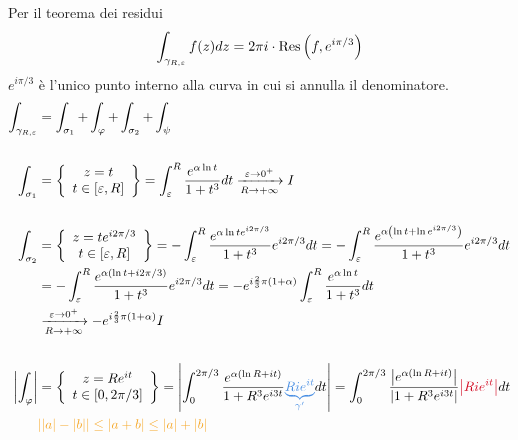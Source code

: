 Per il teorema dei residui
\begin{equation*}
\int_{\gamma_{R, \varepsilon}} f(z) dz = 2\pi i \cdot \operatorname{Res} \left(f, e^{i\pi /3}\right)
\end{equation*}
$e^{i\pi /3}$ è l'unico punto interno alla curva in cui si annulla il denominatore.
\begin{equation*}
\begin{aligned}
\int_{\gamma_{R, \varepsilon}} & = \int_{\sigma_{1}} + \int_{\varphi} + \int_{\sigma_{2}} + \int_{\psi}\\
 & \\
\int_{\sigma_{1}} & = \left\{
\begin{array}{c}
z = t\\
t\in [ \varepsilon, R]
\end{array}\right\} = \int^{R}_{\varepsilon}\frac{e^{\alpha \ln t}}{1 + t^{3}} dt\xrightarrow[R\rightarrow + \infty ]{\varepsilon \rightarrow 0^{+}} I\\
 & \\
\int_{\sigma_{2}} & = \left\{
\begin{array}{c}
z = te^{i2\pi /3}\\
t\in [ \varepsilon, R]
\end{array}\right\} = - \int^{R}_{\varepsilon}\frac{e^{\alpha \ln te^{i2\pi /3}}}{1 + t^{3}} e^{i2\pi /3} dt = -\int^{R}_{\varepsilon}\frac{e^{\alpha \left(\ln t + \ln e^{i2\pi /3}\right)}}{1 + t^{3}} e^{i2\pi /3} dt\\
 & = - \int^{R}_{\varepsilon}\frac{e^{\alpha (\ln t + i2\pi /3)}}{1 + t^{3}} e^{i2\pi /3} dt = -e^{i\frac{2}{3} \pi (1 + \alpha)}\int^{R}_{\varepsilon}\frac{e^{\alpha \ln t}}{1 + t^{3}} dt\\
 & \xrightarrow[R\rightarrow + \infty ]{\varepsilon \rightarrow 0^{+}} - e^{i\frac{2}{3} \pi (1 + \alpha)} I\\
 & \\
\left| \int_{\varphi}\right|  & = \left\{
\begin{array}{c}
z = Re^{it}\\
t\in [ 0, 2\pi /3]
\end{array}\right\} = \left| \int^{2\pi /3}_{0}\frac{e^{\alpha (\ln R + it)}}{1 + R^{3} e^{i3t}}\textcolor[rgb]{0.29, 0.56, 0.89}{\underbrace{Rie^{it}}_{\gamma '}} dt\right| = \int^{2\pi /3}_{0}\frac{\left| e^{\alpha (\ln R + it)}\right|}{\left| 1 + R^{3} e^{i3t}\right|}\textcolor[rgb]{0.82, 0.01, 0.11}{\left| Rie^{it}\right|} dt\\
 & \textcolor[rgb]{0.96, 0.65, 0.14}{| | a| - | b| | \leq | a + b| \leq | a| + | b|}\\

\end{aligned}
\end{equation*}
